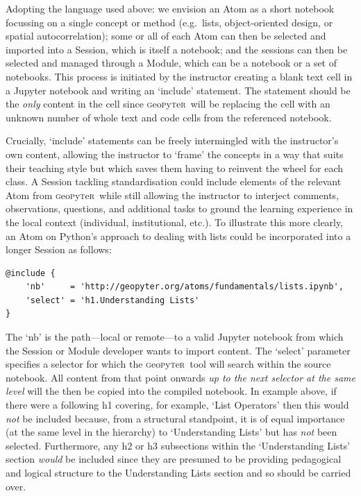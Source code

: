 \documentclass[letter, 11pt,titlepage]{article}
\newcommand{\gp}{\textsc{g}eo\textsc{p}y\textsc{t}e\textsc{r}~\/}
\newcommand{\eg}{e.g.~\/}
\begin{document}
Adopting the language used above: we envision an Atom as a short notebook
focussing on a single concept or method (\eg lists, object-oriented design, or
spatial autocorrelation); some or all of each Atom can then be selected and
imported into a Session, which is itself a notebook; and the sessions can then
be selected and managed through a Module, which can be a notebook or a set of
notebooks. This process is initiated by the instructor creating a blank text
cell in a Jupyter notebook and writing an `include' statement. The statement
should be the \textit{only} content in the cell since \gp will be replacing the
cell with an unknown number of whole text and code cells from the referenced
notebook.

Crucially, `include' statements can be freely intermingled with the instructor's
own content, allowing the instructor to `frame' the concepts in a way that suits
their teaching style but which saves them having to reinvent the wheel for each
class. A Session tackling standardisation could include elements of the relevant
Atom from \gp while still allowing the instructor to interject comments,
observations, questions, and additional tasks to ground the learning experience
in the local context (individual, institutional, etc.). To illustrate this more
clearly, an Atom on Python's approach to dealing with lists could be
incorporated into a longer Session as follows:

\begin{Verbatim}[fontsize=\small]
@include {
    'nb'     = 'http://geopyter.org/atoms/fundamentals/lists.ipynb',
    'select' = 'h1.Understanding Lists'
}
\end{Verbatim}

The `nb' is the path---local or remote---to a valid Jupyter notebook from which
the Session or Module developer wants to import content. The `select' parameter
specifies a selector for which the \gp tool will search within the source
notebook. All content from that point onwards \emph{up to the next selector at
the same level} will the then be copied into the compiled notebook. In example
above, if there were a following h1 covering, for example, `List Operators' then
this would \emph{not} be included because, from a structural standpoint, it is
of equal importance (at the same level in the hierarchy) to `Understanding
Lists' but has \emph{not} been selected. Furthermore, any h2 or h3 subsections
within the `Understanding Lists' section \textit{would} be included since they
are presumed to be providing pedagogical and logical structure to the
Understanding Lists section and so should be carried over.
\end{document}
